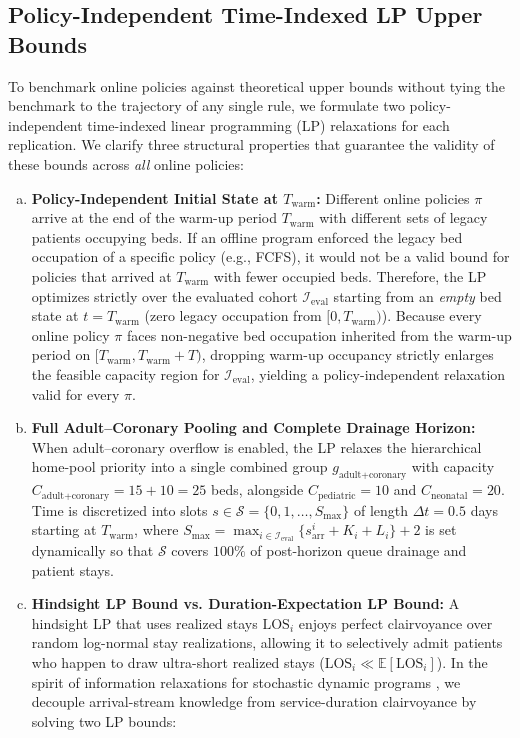 \documentclass[final,5p,times,twocolumn]{elsarticle}
\begin{document}
\subsection{Policy-Independent Time-Indexed LP Upper Bounds}
\label{sec:milp_bound}

To benchmark online policies against theoretical upper bounds without tying the benchmark to the trajectory of any single rule, we formulate two policy-independent time-indexed linear programming (LP) relaxations for each replication. We clarify three structural properties that guarantee the validity of these bounds across \textit{all} online policies:
\begin{enumerate}[(a)]
    \item \textbf{Policy-Independent Initial State at $T_{\text{warm}}$:} Different online policies $\pi$ arrive at the end of the warm-up period $T_{\text{warm}}$ with different sets of legacy patients occupying beds. If an offline program enforced the legacy bed occupation of a specific policy (e.g., FCFS), it would not be a valid bound for policies that arrived at $T_{\text{warm}}$ with fewer occupied beds. Therefore, the LP optimizes strictly over the evaluated cohort $\mathcal{I}_{\text{eval}}$ starting from an \textit{empty} bed state at $t = T_{\text{warm}}$ (zero legacy occupation from $[0, T_{\text{warm}})$). Because every online policy $\pi$ faces non-negative bed occupation inherited from the warm-up period on $[T_{\text{warm}}, T_{\text{warm}} + T)$, dropping warm-up occupancy strictly enlarges the feasible capacity region for $\mathcal{I}_{\text{eval}}$, yielding a policy-independent relaxation valid for every $\pi$.
    \item \textbf{Full Adult--Coronary Pooling and Complete Drainage Horizon:} When adult--coronary overflow is enabled, the LP relaxes the hierarchical home-pool priority into a single combined group $g_{\text{adult+coronary}}$ with capacity $C_{\text{adult+coronary}} = 15 + 10 = 25$ beds, alongside $C_{\text{pediatric}} = 10$ and $C_{\text{neonatal}} = 20$. Time is discretized into slots $s \in \mathcal{S} = \{0, 1, \dots, S_{\max}\}$ of length $\Delta t = 0.5$ days starting at $T_{\text{warm}}$, where $S_{\max} = \max_{i \in \mathcal{I}_{\text{eval}}} \{ s_{\text{arr}}^i + K_i + L_i \} + 2$ is set dynamically so that $\mathcal{S}$ covers $100\%$ of post-horizon queue drainage and patient stays.
    \item \textbf{Hindsight LP Bound vs. Duration-Expectation LP Bound:} A hindsight LP that uses realized stays $\text{LOS}_i$ enjoys perfect clairvoyance over random log-normal stay realizations, allowing it to selectively admit patients who happen to draw ultra-short realized stays ($\text{LOS}_i \ll \mathbb{E}[\text{LOS}_i]$). In the spirit of information relaxations for stochastic dynamic programs \cite{brown2010information}, we decouple arrival-stream knowledge from service-duration clairvoyance by solving two LP bounds:

\end{enumerate}
\end{document}
